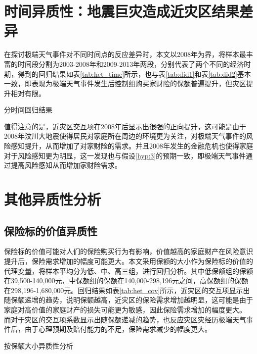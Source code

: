 \section{时间异质性：地震巨灾造成近灾区结果差异}

在探讨极端天气事件对不同时间点的反应差异时，本文以2008年为界，将样本最丰富的时间段分割为2003-2008年和2009-2013年两段，分别代表了两个不同的经济时期，得到的回归结果如表\ref{tab:het_time}所示，也与表\ref{tab:did1}和表\ref{tab:did2}基本一致，即表现为极端天气事件发生后控制组购买家财险的保额普遍提升，但灾区提升相对有限。

\begin{table}[ht]
    \centering
    \renewcommand{\arraystretch}{1}
    \caption{分时间回归结果}\label{tab:het_time}
    
\end{table}

值得注意的是，近灾区交互项在2008年后显示出很强的正向提升，这可能是由于2008年汶川大地震使得居民对家庭所在周边的环境更为关注，对极端天气事件的风险感知提升，从而增加了对家财险的需求。并且2008年发生的金融危机也使得家庭对于风险感知更为明显，这一发现也与假设\ref{hyp:3}的预期一致，即极端天气事件通过提高风险感知从而增加家财险需求。

\section{其他异质性分析}
\subsection{保险标的价值异质性}
保险标的价值可能对人们的保险购买行为有影响，价值越高的家庭财产在风险意识提升后，保险需求增加的幅度可能更大。本文采用保额的大小作为保险标的价值的代理变量，将样本平均分为低、中、高三组，进行回归分析。其中低保额组的保额在39,500-140,000元，中保额组的保额在140,000-298,196元之间，高保额组的保额在298,196-1,680,000元。回归结果如表\ref{tab:het_cov}所示，近灾区的交互项显示出随保额递增的趋势，说明保额越高，近灾区的保险需求增加越明显，这可能是由于家庭对高价值的家庭财产的损失可能更为敏感，因此保险需求增加的幅度更大。
而对于灾区的交互项系数显示出随保额递减的趋势，也反应灾区灾经历极端天气事件后，由于心理预期及赔付能力的不足，保险需求减少的幅度更大。
\begin{table}
    \centering
    \caption{按保额大小异质性分析}\label{tab:het_cov}
    
\end{table}

